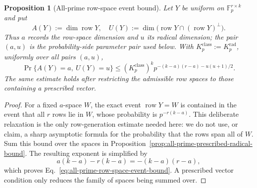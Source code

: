 \documentclass[11pt]{article}
\newcommand{\F}{\mathbb F}
\newcommand{\1}{\mathbf 1}
\theoremstyle{plain}
\newtheorem{proposition}[theorem]{Proposition}
\theoremstyle{definition}
\theoremstyle{remark}
\begin{document}
\begin{proposition}[All-prime row-space event bound]
\label{prop:all-prime-row-space-event-bound}
Let $Y$ be uniform on $\F_p^{r\times k}$ and put
\begin{equation}
 A(Y):=\dim\operatorname{row}Y,
 \quad
 U(Y):=\dim\bigl(\operatorname{row}Y\cap
                         (\operatorname{row}Y)^\perp\bigr).
 \label{eq:all-prime-row-space-invariants}
\end{equation}
Thus $a$ records the row-space dimension and $u$ its radical dimension; the
pair $(a,u)$ is the probability-side parameter pair used below.  With
$K_p^{\mathrm{class}}:=K_p^{\mathrm{rad}}$, uniformly over all pairs
$(a,u)$,
\begin{equation}
 \Pr\{A(Y)=a,\ U(Y)=u\}
 \le (K_p^{\mathrm{class}})^k
 p^{-(k-a)(r-a)-u(u+1)/2}.
 \label{eq:all-prime-row-space-event-bound}
\end{equation}
The same estimate holds after restricting the admissible row spaces to those
containing a prescribed vector.
\end{proposition}
\begin{proof}
For a fixed $a$-space $W$, the exact event
$\operatorname{row}Y=W$ is contained in the event that all $r$ rows lie in
$W$, whose probability is $p^{-r(k-a)}$.  This deliberate relaxation is the
only row-generation estimate needed here: we do not use, or claim, a sharp
asymptotic formula for the probability that the rows span all of $W$.  Sum this bound over the spaces in
Proposition~\ref{prop:all-prime-prescribed-radical-bound}.  The resulting
exponent is simplified by
\begin{equation}
 a(k-a)-r(k-a)=-(k-a)(r-a),
 \label{eq:all-prime-row-space-exponent-identity}
\end{equation}
which proves Eq.~\eqref{eq:all-prime-row-space-event-bound}.  A prescribed
vector condition only reduces the family of spaces being summed over.
\end{proof}
\end{document}
